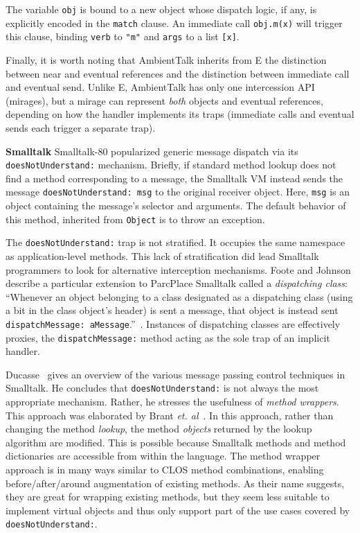\documentclass{sig-alternate}
\begin{document}
The variable \texttt{obj} is bound to a new object whose dispatch logic, if any, is explicitly encoded in the \texttt{match} clause. An immediate call \texttt{obj.m(x)} will trigger this clause, binding \texttt{verb} to \texttt{"m"} and \texttt{args} to a list \texttt{[x]}.

Finally, it is worth noting that AmbientTalk inherits from E the distinction between near and eventual references and the distinction between immediate call and eventual send. Unlike E, AmbientTalk has only one intercession API (mirages), but a mirage can represent \emph{both} objects and eventual references, depending on how the handler implements its traps (immediate calls and eventual sends each trigger a separate trap).

\textbf{Smalltalk} Smalltalk-80 popularized generic message dispatch via its \texttt{doesNotUnderstand:} mechanism. Briefly, if standard method lookup does not find a method corresponding to a message, the Smalltalk VM instead sends the message \texttt{doesNotUnderstand: msg} to the original receiver object. Here, \texttt{msg} is an object containing the message's selector and arguments. The default behavior of this method, inherited from \texttt{Object} is to throw an exception.

The \texttt{doesNotUnderstand:} trap is not stratified. It occupies the same namespace as application-level methods. This lack of stratification did lead Smalltalk programmers to look for alternative interception mechanisms. Foote and Johnson describe a particular extension to ParcPlace Smalltalk called a \emph{dispatching class}: ``Whenever an object belonging to a class designated as a dispatching class (using a bit in the class object's header) is sent a message, that object is instead sent \texttt{dispatchMessage: aMessage}.''~\cite{foote89reflective}. Instances of dispatching classes are effectively proxies, the \texttt{dispatchMessage:} method acting as the sole trap of an implicit handler.

Ducasse~\cite{ducasse99evaluatingmessage} gives an overview of the various message passing control techniques in Smalltalk. He concludes that \texttt{doesNotUnderstand:} is not always the most appropriate mechanism. Rather, he stresses the usefulness of \emph{method wrappers}. This approach was elaborated by Brant \emph{et. al}~\cite{brant98wrappers}. In this approach, rather than changing the method \emph{lookup}, the method \emph{objects} returned by the lookup algorithm are modified. This is possible because Smalltalk methods and method dictionaries are accessible from within the language. The method wrapper approach is in many ways similar to CLOS method combinations, enabling before/after/around augmentation of existing methods. As their name suggests, they are great for wrapping existing methods, but they seem less suitable to implement virtual objects and thus only support part of the use cases covered by \texttt{doesNotUnderstand:}.
\end{document}
